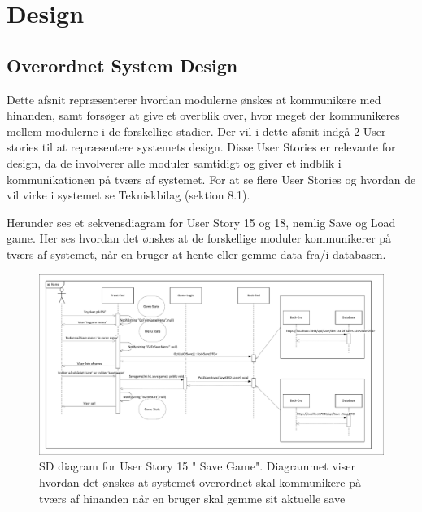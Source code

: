 \section{Design}

\subsection{Overordnet System Design}
\noindent Dette afsnit repræsenterer hvordan modulerne ønskes at kommunikere med hinanden, samt forsøger at give et overblik over, hvor meget der kommunikeres mellem modulerne i de forskellige stadier. Der vil i dette afsnit indgå 2 User stories til at repræsentere systemets design. Disse User Stories er relevante for design, da de involverer alle moduler samtidigt og giver et indblik i kommunikationen på tværs af systemet. For at se flere User Stories og hvordan de vil virke i systemet se Tekniskbilag (sektion 8.1).

\noindent Herunder ses et sekvensdiagram for User Story 15 og 18, nemlig Save og Load game. Her ses hvordan det ønskes at de forskellige moduler kommunikerer på tværs af systemet, når en bruger at hente eller gemme data fra/i databasen.
\begin{figure}[H]
\centering
\includegraphics[width = \textwidth]{02-Body/Images/Arkitektur-SDSaveGame}
\caption{SD diagram for User Story 15 " Save Game". Diagrammet viser hvordan det ønskes at systemet overordnet skal kommunikere på tværs af hinanden når en bruger skal gemme sit aktuelle save}
\label{fig:Arkitektur-SD-SaveGame}
\end{figure}

